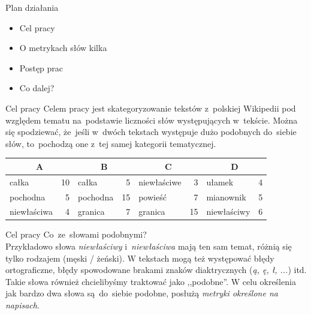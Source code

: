 \documentclass[11pt,pdftex,mathserif]{beamer}\usepackage[]{graphicx}\usepackage[]{color}
\theoremstyle{definition}
\begin{document}



\begin{frame}{Plan działania}
\begin{itemize}
  \item Cel pracy
  \item O metrykach słów kilka
  \item Postęp prac
  \item Co dalej?
\end{itemize}
\end{frame}


\begin{frame}{Cel pracy}
Celem pracy jest skategoryzowanie tekstów z~polskiej Wikipedii pod względem tematu na~podstawie liczności słów występujących w~tekście. Można się spodziewać, że~jeśli w~dwóch tekstach występuje dużo podobnych do~siebie słów, to~pochodzą one z~tej samej kategorii tematycznej. \\
\pause
\begin{tabular}{ |l r|l r|l r|l r| }
  \hline
  \multicolumn{2}{|c|}{A} & \multicolumn{2}{|c|}{B} & \multicolumn{2}{|c|}{C} & \multicolumn{2}{|c|}{D} \\
  \hline
  całka & 10 & całka & 5 & niewłaściwe & 3 & ułamek & 4 \\
  pochodna & 5 & pochodna & 15 & powieść & 7 & mianownik & 5 \\
  niewłaściwa & 4 & granica & 7 & granica & 15 & niewłaściwy & 6 \\
  \hline
\end{tabular}
\end{frame}


\begin{frame}{Cel pracy}
Co~ze~słowami podobnymi?\\
Przykładowo słowa \emph{niewłaściwy} i~\emph{niewłaściwa} mają ten sam temat, różnią się tylko rodzajem (męski / żeński). W tekstach mogą też występować błędy ortograficzne, błędy spowodowane brakami znaków diaktrycznych (\emph{ą, ę, ł, ...}) itd. Takie słowa również chcielibyśmy traktować jako ,,podobne''. W celu określenia jak bardzo dwa słowa są~do~siebie podobne, posłużą \emph{metryki określone na napisach}.
\end{frame}
\end{document}

